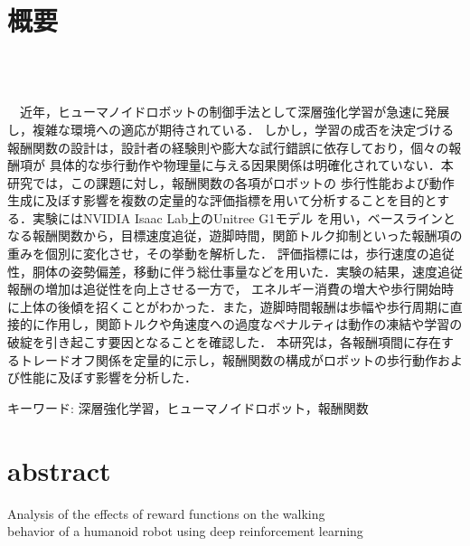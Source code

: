 \chapter*{概要}
\thispagestyle{empty}
%
\begin{center}
  \\
    \vspace{-0.3zh}
  \\
\end{center}
\vspace{1.0zh}
% 
　近年，ヒューマノイドロボットの制御手法として深層強化学習が急速に発展し，複雑な環境への適応が期待されている．
しかし，学習の成否を決定づける報酬関数の設計は，設計者の経験則や膨大な試行錯誤に依存しており，個々の報酬項が
具体的な歩行動作や物理量に与える因果関係は明確化されていない．本研究では，この課題に対し，報酬関数の各項がロボットの
歩行性能および動作生成に及ぼす影響を複数の定量的な評価指標を用いて分析することを目的とする．実験にはNVIDIA Isaac Lab上のUnitree G1モデル
を用い，ベースラインとなる報酬関数から，目標速度追従，遊脚時間，関節トルク抑制といった報酬項の重みを個別に変化させ，その挙動を解析した．
評価指標には，歩行速度の追従性，胴体の姿勢偏差，移動に伴う総仕事量などを用いた．実験の結果，速度追従報酬の増加は追従性を向上させる一方で，
エネルギー消費の増大や歩行開始時に上体の後傾を招くことがわかった．また，遊脚時間報酬は歩幅や歩行周期に直接的に作用し，関節トルクや角速度への過度なペナルティは動作の凍結や学習の破綻を引き起こす要因となることを確認した．
本研究は，各報酬項間に存在するトレードオフ関係を定量的に示し，報酬関数の構成がロボットの歩行動作および性能に及ぼす影響を分析した．

キーワード: 深層強化学習，ヒューマノイドロボット，報酬関数
%
\newpage
\chapter*{abstract}
\thispagestyle{empty}
%

\begin{center}
  Analysis of the effects of reward functions on the walking\\
  behavior of a humanoid robot using deep reinforcement learning
\end{center}

